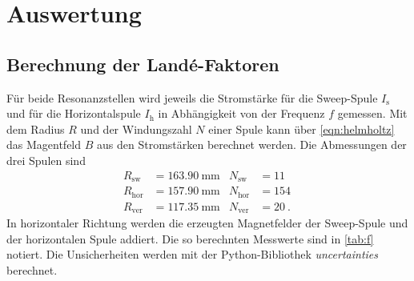\section{Auswertung}
\label{sec:Auswertung}

\subsection{Berechnung der Landé-Faktoren}
\label{ssec:lande}

Für beide Resonanzstellen wird jeweils die Stromstärke für die Sweep-Spule $I_\text{s}$ und für die Horizontalspule $I_\text{h}$ in Abhängigkeit von der Frequenz $f$ gemessen.
Mit dem Radius $R$ und der Windungszahl $N$ einer Spule kann über \autoref{eqn:helmholtz} das Magentfeld $B$ aus den Stromstärken berechnet werden.
Die Abmessungen der drei Spulen sind 
\begin{align*}
    R_\text{sw} &= \qty{163.90}{\milli\meter} & N_\text{sw} &= \qty{11}{}\\
    R_\text{hor} &= \qty{157.90}{\milli\meter} & N_\text{hor} &= \qty{154}{}\\
    R_\text{ver} &= \qty{117.35}{\milli\meter} & N_\text{ver} &= \qty{20}{}.
\end{align*}
In horizontaler Richtung werden die erzeugten Magnetfelder der Sweep-Spule und der horizontalen Spule addiert.
Die so berechnten Messwerte sind in \autoref{tab:f} notiert.
Die Unsicherheiten werden mit der Python-Bibliothek \textit{uncertainties} \cite{uncertainties} berechnet.

